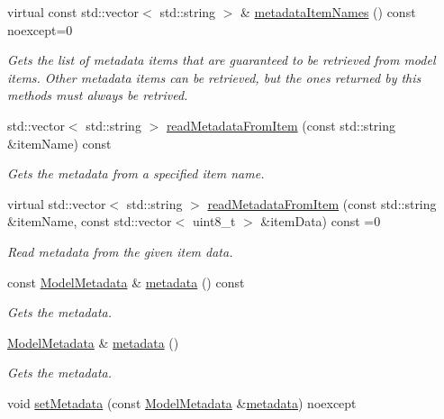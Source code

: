 \begin{DoxyCompactItemize}
virtual const std\+::vector$<$ std\+::string $>$ \& \hyperlink{group___classification_module_ga6b5ceb1c678e1afe83dbe6e30e82960d}{metadata\+Item\+Names} () const noexcept=0
\begin{DoxyCompactList}\small\item\em Gets the list of metadata items that are guaranteed to be retrieved from model items. Other metadata items can be retrieved, but the ones returned by this methods must always be retrived. \end{DoxyCompactList}\item 
std\+::vector$<$ std\+::string $>$ \hyperlink{group___classification_module_gaa50c6f125db866bddba70b958c6a1074}{read\+Metadata\+From\+Item} (const std\+::string \&item\+Name) const 
\begin{DoxyCompactList}\small\item\em Gets the metadata from a specified item name. \end{DoxyCompactList}\item 
virtual std\+::vector$<$ std\+::string $>$ \hyperlink{group___classification_module_ga479f0578c384bfe7d21f32d4bfb33983}{read\+Metadata\+From\+Item} (const std\+::string \&item\+Name, const std\+::vector$<$ uint8\+\_\+t $>$ \&item\+Data) const =0
\begin{DoxyCompactList}\small\item\em Read metadata from the given item data. \end{DoxyCompactList}\item 
const \hyperlink{classdg_1_1deepcore_1_1classification_1_1_model_metadata}{Model\+Metadata} \& \hyperlink{group___classification_module_gaa88957807aa9cd63108033b376e60ef2}{metadata} () const 
\begin{DoxyCompactList}\small\item\em Gets the metadata. \end{DoxyCompactList}\item 
\hyperlink{classdg_1_1deepcore_1_1classification_1_1_model_metadata}{Model\+Metadata} \& \hyperlink{group___classification_module_ga1d2576e90ac787ae30dffb0920d48462}{metadata} ()
\begin{DoxyCompactList}\small\item\em Gets the metadata. \end{DoxyCompactList}\item 
void \hyperlink{group___classification_module_ga240a62f23ad36c3eac6b7c91d90708d7}{set\+Metadata} (const \hyperlink{classdg_1_1deepcore_1_1classification_1_1_model_metadata}{Model\+Metadata} \&\hyperlink{group___classification_module_gaa88957807aa9cd63108033b376e60ef2}{metadata}) noexcept

\end{DoxyCompactItemize}
